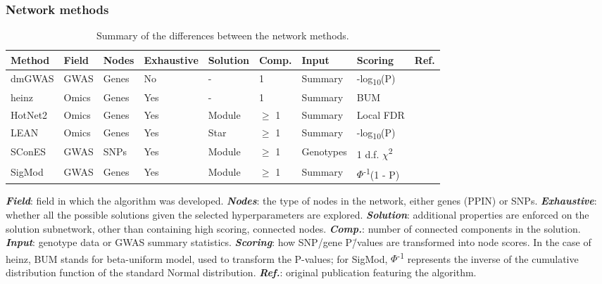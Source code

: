 \documentclass[twocolumn, 11pt]{article}
\begin{document}
\subsubsection{Network methods}
\label{methods:methods}

\begin{table}[htbp]
  \caption{Summary of the differences between the network methods.}
  \label{tab:method_comparison}
  \centering
  \begin{threeparttable}
    \begin{tabular}{l|llllllll}
      Method & Field & Nodes & Exhaustive & Solution & Comp. & Input & Scoring & Ref.\\
      \hline
      dmGWAS & GWAS & Genes & No & - & 1 & Summary & -log\textsubscript{10}(P) & \cite{jia_dmgwas:_2011}\\
      heinz & Omics & Genes & Yes & - & 1 & Summary & BUM & \cite{dittrich_identifying_2008}\\
      HotNet2 & Omics & Genes & Yes & Module & \(\ge\) 1 & Summary & Local FDR & \cite{leiserson_pan-cancer_2015}\\
      LEAN & Omics & Genes & Yes & Star & \(\ge\) 1 & Summary & -log\textsubscript{10}(P) & \cite{gwinner_network-based_2016}\\
      SConES & GWAS & SNPs & Yes & Module & \(\ge\) 1 & Genotypes & 1 d.f. \(\chi\)\textsuperscript{2} & \cite{azencott_efficient_2013}\\
      SigMod & GWAS & Genes & Yes & Module & \(\ge\) 1 & Summary & $\Phi$\textsuperscript{-1}(1 - P) & \cite{liu_sigmod:_2017}\\
    \end{tabular}
    \begin{tablenotes}
      \footnotesize{
        \item \textbf{\emph{Field}}: field in which the algorithm was developed. \textbf{\emph{Nodes}}: the type of nodes in the network, either genes (PPIN) or SNPs. \textbf{\emph{Exhaustive}}: whether all the possible solutions given the selected hyperparameters are explored. \textbf{\emph{Solution}}: additional properties are enforced on the solution subnetwork, other than containing high scoring, connected nodes. \textbf{\emph{Comp.}}: number of connected components in the solution. \textbf{\emph{Input}}: genotype data or GWAS summary statistics. \textbf{\emph{Scoring}}: how SNP/gene P\=/values are transformed into node scores. In the case of heinz, BUM stands for beta-uniform model, used to transform the P-values; for SigMod, $\Phi$\textsuperscript{-1} represents the inverse of the
        cumulative distribution function of the standard Normal distribution. \textbf{\emph{Ref.}}: original publication featuring the algorithm.
      }
    \end{tablenotes}
  \end{threeparttable}
\end{table}
\end{document}
